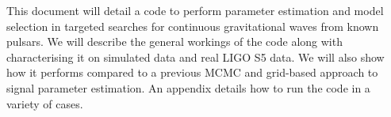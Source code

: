 This document will detail a code to perform parameter estimation and model selection in targeted
searches for continuous gravitational waves from known pulsars. We will describe the general
workings of the code along with characterising it on simulated data and real LIGO S5 data.
We will also show how it performs compared to a previous MCMC and grid-based approach to signal
parameter estimation. An appendix details how to run the code in a variety of cases.
